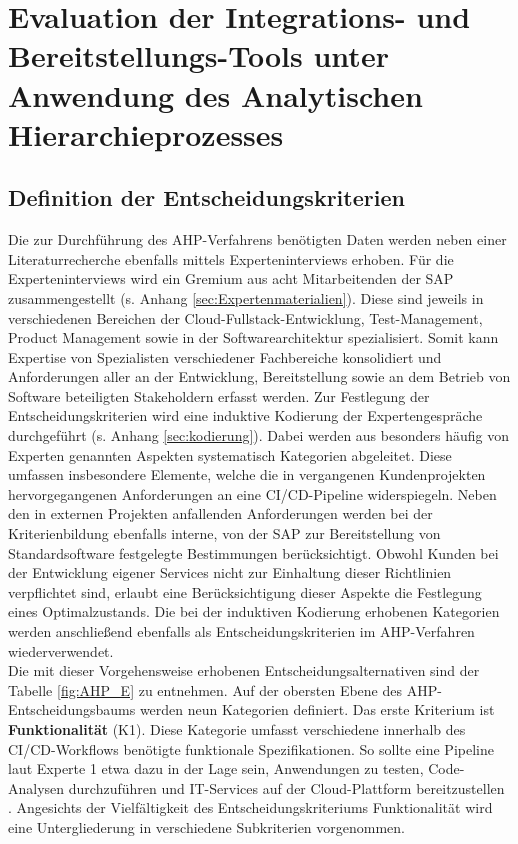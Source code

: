 \section{Evaluation der Integrations- und Bereitstellungs-Tools unter Anwendung des Analytischen Hierarchieprozesses}
\label{sec:AHP}
\subsection{Definition der Entscheidungskriterien}
 Die zur Durchführung des AHP-Verfahrens benötigten Daten werden neben einer Literaturrecherche ebenfalls mittels Experteninterviews erhoben. Für die Experteninterviews wird ein Gremium aus acht Mitarbeitenden der SAP zusammengestellt (s. Anhang \ref{sec:Expertenmaterialien}). Diese sind jeweils in verschiedenen Bereichen der Cloud-Fullstack-Entwicklung, Test-Management, Product Management sowie in der Softwarearchitektur spezialisiert. Somit kann Expertise von Spezialisten verschiedener Fachbereiche konsolidiert und Anforderungen aller an der Entwicklung, Bereitstellung sowie an dem Betrieb von Software beteiligten Stakeholdern erfasst werden. Zur Festlegung der Entscheidungskriterien wird eine induktive Kodierung der Expertengespräche durchgeführt (s. Anhang \ref{sec:kodierung}). Dabei werden aus besonders häufig von Experten genannten Aspekten systematisch Kategorien abgeleitet. Diese umfassen insbesondere Elemente, welche die in vergangenen Kundenprojekten hervorgegangenen Anforderungen an eine CI/CD-Pipeline widerspiegeln. Neben den in externen Projekten anfallenden Anforderungen werden bei der Kriterienbildung ebenfalls interne, von der SAP zur Bereitstellung von Standardsoftware festgelegte Bestimmungen berücksichtigt. Obwohl Kunden bei der Entwicklung eigener Services nicht zur Einhaltung dieser Richtlinien verpflichtet sind, erlaubt eine Berücksichtigung dieser Aspekte die Festlegung eines Optimalzustands. Die bei der induktiven Kodierung erhobenen Kategorien werden anschließend ebenfalls als Entscheidungskriterien im AHP-Verfahren wiederverwendet.\\ Die mit dieser Vorgehensweise erhobenen Entscheidungsalternativen sind der Tabelle \ref{fig:AHP_E} zu entnehmen. 
 Auf der obersten Ebene des AHP-Entscheidungsbaums werden neun Kategorien definiert. Das erste Kriterium ist \textbf{Funktionalität} (K1). Diese Kategorie umfasst verschiedene innerhalb des CI/CD-Workflows benötigte funktionale Spezifikationen. So sollte eine Pipeline laut Experte 1 etwa dazu in der Lage sein, Anwendungen zu testen, Code-Analysen durchzuführen und IT-Services auf der Cloud-Plattform bereitzustellen \cite[Z. 72 ff.]{ProductOwnerSAPBTPProd&Infra.}. Angesichts der Vielfältigkeit des Entscheidungskriteriums Funktionalität wird eine Untergliederung in verschiedene Subkriterien vorgenommen. 
